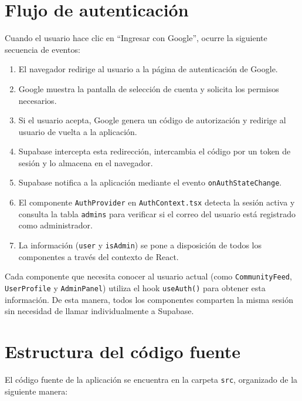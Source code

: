\documentclass[12pt,a4paper]{article}
\begin{document}
\section{Flujo de autenticación}

Cuando el usuario hace clic en ``Ingresar con Google'', ocurre la siguiente secuencia de eventos:

\begin{enumerate}
    \item El navegador redirige al usuario a la página de autenticación de Google.
    \item Google muestra la pantalla de selección de cuenta y solicita los permisos necesarios.
    \item Si el usuario acepta, Google genera un código de autorización y redirige al usuario de vuelta a la aplicación.
    \item Supabase intercepta esta redirección, intercambia el código por un token de sesión y lo almacena en el navegador.
    \item Supabase notifica a la aplicación mediante el evento \texttt{onAuthStateChange}.
    \item El componente \texttt{AuthProvider} en \texttt{AuthContext.tsx} detecta la sesión activa y consulta la tabla \texttt{admins} para verificar si el correo del usuario está registrado como administrador.
    \item La información (\texttt{user} y \texttt{isAdmin}) se pone a disposición de todos los componentes a través del contexto de React.
\end{enumerate}

Cada componente que necesita conocer al usuario actual (como \texttt{CommunityFeed}, \texttt{UserProfile} y \texttt{AdminPanel}) utiliza el hook \texttt{useAuth()} para obtener esta información. De esta manera, todos los componentes comparten la misma sesión sin necesidad de llamar individualmente a Supabase.

\section{Estructura del código fuente}

El código fuente de la aplicación se encuentra en la carpeta \texttt{src}, organizado de la siguiente manera:
\end{document}

